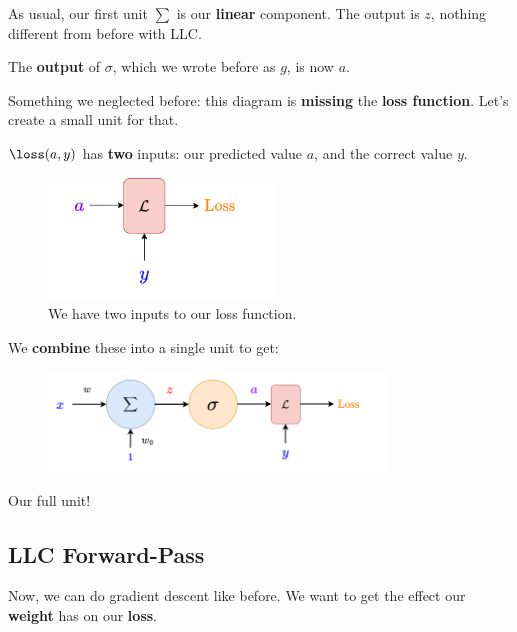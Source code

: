        As usual, our first unit $\sum$ is our \textbf{linear} component. The output is $z$, nothing different from before with LLC.
        
        The \textbf{output} of $\sigma$, which we wrote before as $g$, is now $a$.
        
        Something we neglected before: this diagram is \textbf{missing} the \textbf{loss function}. Let's create a small unit for that. 
        
        $\loss(a,y)$ has \textbf{two} inputs: our predicted value $a$, and the correct value $y$. 
        
        \begin{figure}[H]
            \centering
            \includegraphics[width=60mm,scale=0.4]{images/nn_1_5_images/loss_unit.png}
            \caption*{We have two inputs to our loss function.}
        \end{figure}
        
        We \textbf{combine} these into a single unit to get:
        
        \begin{figure}[H]
            \centering
            \includegraphics[width=90mm,scale=0.4]{images/nn_1_5_images/llc_as_neuron_loss.png}
        \end{figure}
        
        Our full unit!
        
    \secdiv
    
    \subsection{LLC Forward-Pass}
    
        Now, we can do gradient descent like before. We want to get the effect our \textbf{weight} has on our \textbf{loss}.
        
